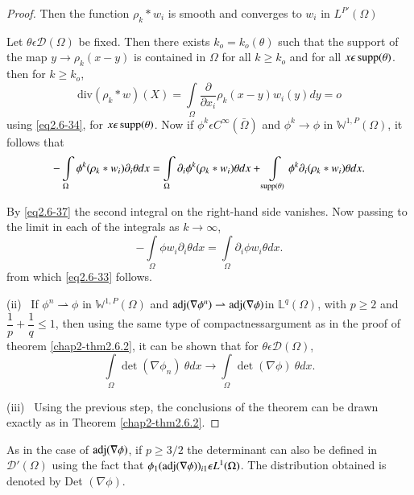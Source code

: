 \begin{proof}
Then the function $\rho_k * w_i$ is smooth and converges to $w_i$ in
$L^{P'}(\Omega)$ 

Let $\theta \epsilon \mathcal{D}(\Omega)$ be fixed. Then there
exists $k_o = k_o(\theta)$ such that the support of the map $y \to
\rho_k(x-y)$ is contained in $\Omega$ for all $k \ge k_o$ and for all
$x \epsilon \operatorname{supp} (\theta)$. then for $k \ge k_o$, 
\begin{equation*}
\text{div} (\rho_k * w)(X)=\int\limits_\Omega \frac{\partial}{\partial
  x_i}\rho_k(x-y)w_i(y)dy=o \tag{2.6-37} \label{eq2.6-37}
 \end{equation*} 
 using \eqref{eq2.6-34}, for $x \epsilon \operatorname{supp} (\theta)$. Now if $\phi^k
 \epsilon C^\infty(\bar{\Omega})$ and $\phi^k \to \phi$ in\break
 $\mathbb{W}^{1,P}(\Omega)$, it follows that 
 $$
 - \int\limits_\Omega \phi^k(\rho_k * w_i)\partial_i \theta dx
 =\int\limits_\Omega \partial_i \phi^k(\rho_k *w_i)\theta dx
 +\int\limits_{\operatorname{supp} (\theta)} \phi^k \partial_i (\rho_k * w_i)\theta
 dx. 
 $$
 
 By \eqref{eq2.6-37} the second integral on the right-hand side vanishes. Now
 passing to the limit in each of the integrals as $k \to \infty$, 
 $$
 -\int\limits_\Omega \phi w_i \partial_i \theta dx =
 \int\limits_\Omega \partial_i \phi w_i \theta dx. 
 $$
 from which \eqref{eq2.6-33} follows.

\smallskip 
(ii)~ If $\phi^n \rightharpoonup \phi$ in $\mathbb{W}^{1,P}(\Omega)$
 and $\operatorname{adj}(\nabla \phi^n)\rightharpoonup
 \operatorname{adj}(\nabla \phi)$in $\mathbb{L}^q(\Omega)$, with $p \ge 2$
 and $\dfrac{1}{p}+\dfrac{1}{q}\le 1$, then using the same type of
 compactness\pageoriginale argument as in the proof of theorem
 \ref{chap2-thm2.6.2}, it can be 
 shown that for $\theta \epsilon \mathcal{D}(\Omega)$,  
 $$
 \int\limits_\Omega \det \left(\nabla \phi_n\right)~ \theta dx \to
 \int\limits_\Omega \det \left(\nabla \phi\right)~\theta dx. 
 $$

\smallskip 
(iii)~ Using the previous step, the conclusions of the theorem can be
 drawn exactly as in Theorem \ref{chap2-thm2.6.2}. 
\end{proof}

\begin{remark}\label{chap2-rem2.6.5}%
As in the case of $\operatorname{adj} (\nabla \phi)$, if $p \ge 3/2$ the
determinant can also be defined in $\mathcal{D}'(\Omega)$ using the
fact that $\phi_1(\operatorname{adj} (\nabla \phi))_{i1}\epsilon
L^1(\Omega)$. The distribution obtained is denoted by Det
$(\nabla \phi)$. 
\end{remark}

